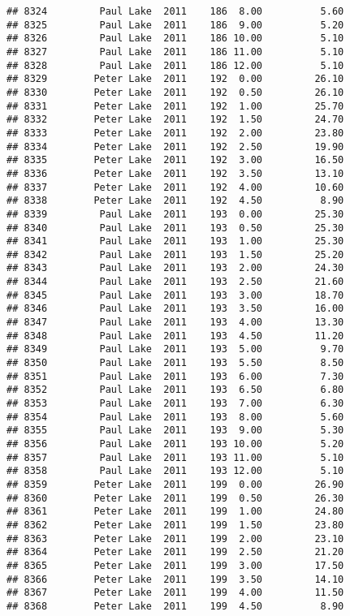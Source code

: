 \documentclass[
]{article}
\begin{document}
\begin{verbatim}
## 8324         Paul Lake  2011    186  8.00          5.60
## 8325         Paul Lake  2011    186  9.00          5.20
## 8326         Paul Lake  2011    186 10.00          5.10
## 8327         Paul Lake  2011    186 11.00          5.10
## 8328         Paul Lake  2011    186 12.00          5.10
## 8329        Peter Lake  2011    192  0.00         26.10
## 8330        Peter Lake  2011    192  0.50         26.10
## 8331        Peter Lake  2011    192  1.00         25.70
## 8332        Peter Lake  2011    192  1.50         24.70
## 8333        Peter Lake  2011    192  2.00         23.80
## 8334        Peter Lake  2011    192  2.50         19.90
## 8335        Peter Lake  2011    192  3.00         16.50
## 8336        Peter Lake  2011    192  3.50         13.10
## 8337        Peter Lake  2011    192  4.00         10.60
## 8338        Peter Lake  2011    192  4.50          8.90
## 8339         Paul Lake  2011    193  0.00         25.30
## 8340         Paul Lake  2011    193  0.50         25.30
## 8341         Paul Lake  2011    193  1.00         25.30
## 8342         Paul Lake  2011    193  1.50         25.20
## 8343         Paul Lake  2011    193  2.00         24.30
## 8344         Paul Lake  2011    193  2.50         21.60
## 8345         Paul Lake  2011    193  3.00         18.70
## 8346         Paul Lake  2011    193  3.50         16.00
## 8347         Paul Lake  2011    193  4.00         13.30
## 8348         Paul Lake  2011    193  4.50         11.20
## 8349         Paul Lake  2011    193  5.00          9.70
## 8350         Paul Lake  2011    193  5.50          8.50
## 8351         Paul Lake  2011    193  6.00          7.30
## 8352         Paul Lake  2011    193  6.50          6.80
## 8353         Paul Lake  2011    193  7.00          6.30
## 8354         Paul Lake  2011    193  8.00          5.60
## 8355         Paul Lake  2011    193  9.00          5.30
## 8356         Paul Lake  2011    193 10.00          5.20
## 8357         Paul Lake  2011    193 11.00          5.10
## 8358         Paul Lake  2011    193 12.00          5.10
## 8359        Peter Lake  2011    199  0.00         26.90
## 8360        Peter Lake  2011    199  0.50         26.30
## 8361        Peter Lake  2011    199  1.00         24.80
## 8362        Peter Lake  2011    199  1.50         23.80
## 8363        Peter Lake  2011    199  2.00         23.10
## 8364        Peter Lake  2011    199  2.50         21.20
## 8365        Peter Lake  2011    199  3.00         17.50
## 8366        Peter Lake  2011    199  3.50         14.10
## 8367        Peter Lake  2011    199  4.00         11.50
## 8368        Peter Lake  2011    199  4.50          8.90

\end{verbatim}
\end{document}
